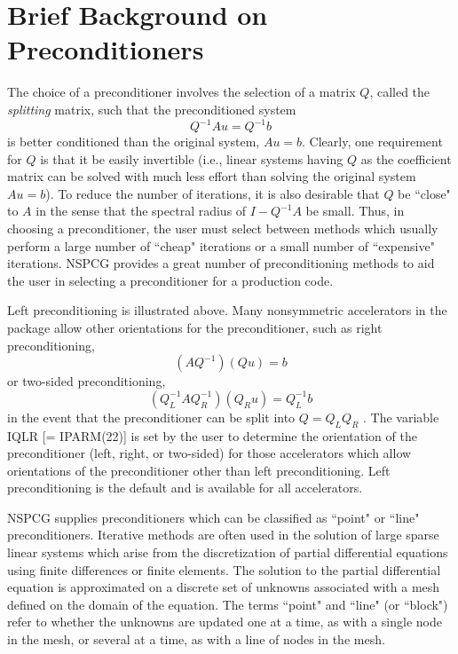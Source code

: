 \newpage
\section{Brief Background on Preconditioners}
\label{bbprecons}
\indent
 
   The choice of a preconditioner involves the selection of a
matrix $Q$, called the {\it splitting\/} matrix, such that the
preconditioned system
\[ Q^{-1}Au = Q^{-1}b \]
is better conditioned than the original system, $Au = b$.  Clearly, 
one requirement for $Q$ is that it be easily invertible (i.e., linear 
systems having $Q$ as the coefficient matrix can be solved with much
less effort than solving the original system $Au=b$). To reduce the 
number of iterations, it is also desirable that $Q$ be ``close" to $A$ 
in the sense that the spectral radius of $I-Q^{-1}A$ be small. Thus,
in choosing a preconditioner, the user must select between methods
which usually perform a large number of ``cheap" iterations or a
small number of ``expensive" iterations.  NSPCG provides a great
number of preconditioning methods to aid the user in selecting a
preconditioner for a production code.

Left preconditioning is illustrated above.  Many nonsymmetric 
accelerators in the package allow other orientations for the 
preconditioner, such as right preconditioning,
\[ (AQ^{-1})(Qu) = b \]
or two-sided preconditioning,
\[ ( Q_L^{-1}AQ_R^{-1}) (Q_Ru) = Q_L^{-1}b \]
in the event that the preconditioner can be split into $Q = Q_LQ_R$ .
The variable IQLR [= IPARM(22)] is set by the user to determine 
the orientation of the preconditioner (left, right, or two-sided)
for those accelerators which allow orientations of the preconditioner
other than left preconditioning.  Left preconditioning is the
default and is available for all accelerators.
 
NSPCG supplies preconditioners which can be classified as ``point" 
or ``line" preconditioners.  Iterative methods are often used in 
the solution of large sparse linear systems which arise from the
discretization of partial differential equations using finite
differences or finite elements.  The solution to the partial
differential equation is approximated on a discrete set of unknowns
associated with a mesh defined on the domain of the equation.  The terms 
``point" and ``line" (or ``block") refer to whether the unknowns are 
updated one at a time, as with a single node in the mesh, or 
several at a time, as with a line of nodes in the mesh. 

